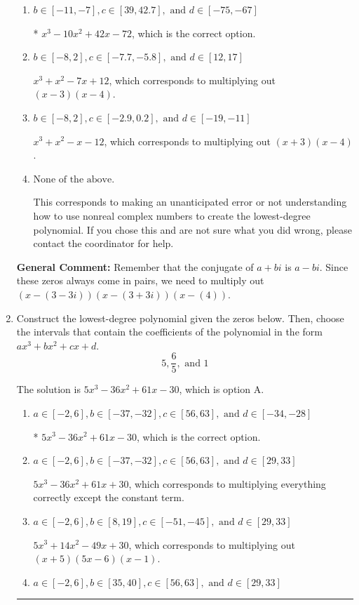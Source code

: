\documentclass{extbook}[14pt]
\newcommand{\litem}[1]{\item #1

\rule{\textwidth}{0.4pt}}
\begin{document}
\begin{enumerate}
{\begin{enumerate}[label=\Alph*.]
$x^{3} +10 x^{2} +42 x + 72$, which corresponds to multiplying out $(x-(3 - 3 i))(x-(3 + 3 i))(x + 4)$.
\item \( b \in [-11, -7], c \in [39, 42.7], \text{ and } d \in [-75, -67] \)

* $x^{3} -10 x^{2} +42 x -72$, which is the correct option.
\item \( b \in [-8, 2], c \in [-7.7, -5.8], \text{ and } d \in [12, 17] \)

$x^{3} + x^{2} -7 x + 12$, which corresponds to multiplying out $(x -3)(x -4)$.
\item \( b \in [-8, 2], c \in [-2.9, 0.2], \text{ and } d \in [-19, -11] \)

$x^{3} + x^{2} -x -12$, which corresponds to multiplying out $(x + 3)(x -4)$.
\item \( \text{None of the above.} \)

This corresponds to making an unanticipated error or not understanding how to use nonreal complex numbers to create the lowest-degree polynomial. If you chose this and are not sure what you did wrong, please contact the coordinator for help.
\end{enumerate}

\textbf{General Comment:} Remember that the conjugate of $a+bi$ is $a-bi$. Since these zeros always come in pairs, we need to multiply out $(x-(3 - 3 i))(x-(3 + 3 i))(x-(4))$.
}
\litem{
Construct the lowest-degree polynomial given the zeros below. Then, choose the intervals that contain the coefficients of the polynomial in the form $ax^3+bx^2+cx+d$.
\[ 5, \frac{6}{5}, \text{ and } 1 \]

The solution is \( 5x^{3} -36 x^{2} +61 x -30 \), which is option A.\begin{enumerate}[label=\Alph*.]
\item \( a \in [-2, 6], b \in [-37, -32], c \in [56, 63], \text{ and } d \in [-34, -28] \)

* $5x^{3} -36 x^{2} +61 x -30$, which is the correct option.
\item \( a \in [-2, 6], b \in [-37, -32], c \in [56, 63], \text{ and } d \in [29, 33] \)

$5x^{3} -36 x^{2} +61 x + 30$, which corresponds to multiplying everything correctly except the constant term.
\item \( a \in [-2, 6], b \in [8, 19], c \in [-51, -45], \text{ and } d \in [29, 33] \)

$5x^{3} +14 x^{2} -49 x + 30$, which corresponds to multiplying out $(x + 5)(5x -6)(x -1)$.
\item \( a \in [-2, 6], b \in [35, 40], c \in [56, 63], \text{ and } d \in [29, 33] \)


\end{enumerate}}
\end{enumerate}
\end{document}
